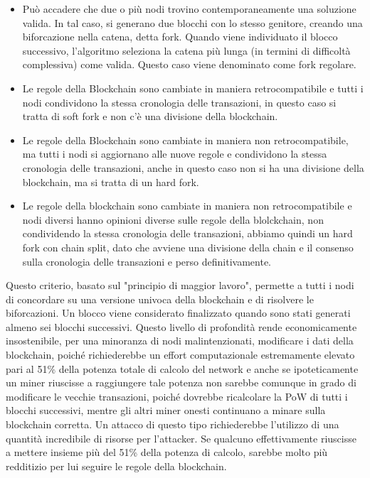 \begin{itemize}
\item Può accadere che due o più nodi trovino contemporaneamente una soluzione valida. In tal caso, si generano due blocchi con lo stesso genitore, creando una biforcazione nella catena, detta fork. Quando viene individuato il blocco successivo, l’algoritmo seleziona la catena più lunga (in termini di difficoltà complessiva) come valida. Questo caso viene denominato come fork regolare.
\item Le regole della Blockchain sono cambiate in maniera retrocompatibile e tutti i nodi condividono la stessa cronologia delle transazioni, in questo caso si tratta di soft fork e non c’è una divisione della blockchain.
\item Le regole della Blockchain sono cambiate in maniera non retrocompatibile, ma tutti i nodi si aggiornano alle nuove regole e condividono la stessa cronologia delle transazioni, anche in questo caso non si ha una divisione della blockchain, ma si tratta di un hard fork.
\item Le regole della blockchain sono cambiate in maniera non retrocompatibile e nodi diversi hanno opinioni diverse sulle regole della blolckchain, non condividendo la stessa cronologia delle transazioni, abbiamo quindi un hard fork con chain split, dato che avviene una divisione della chain e il consenso sulla cronologia delle transazioni e perso definitivamente.
\end{itemize}
Questo criterio, basato sul "principio di maggior lavoro", permette a tutti i nodi di concordare su una versione univoca della blockchain e di risolvere le biforcazioni. Un blocco viene considerato finalizzato quando sono stati generati almeno sei blocchi successivi. Questo livello di profondità rende economicamente insostenibile, per una minoranza di nodi malintenzionati, modificare i dati della blockchain, poiché richiederebbe un effort computazionale estremamente elevato pari al 51\% della potenza totale di calcolo del network e anche se ipoteticamente un miner riuscisse a raggiungere tale potenza non sarebbe comunque in grado di modificare le vecchie transazioni, poiché dovrebbe ricalcolare la PoW di tutti i blocchi successivi, mentre gli altri miner onesti continuano a minare sulla blockchain corretta. Un attacco di questo tipo richiederebbe l’utilizzo di una quantità incredibile di risorse per l’attacker. Se qualcuno effettivamente riuscisse a mettere insieme più del 51\% della potenza di calcolo, sarebbe molto più redditizio per lui seguire le regole della blockchain.
